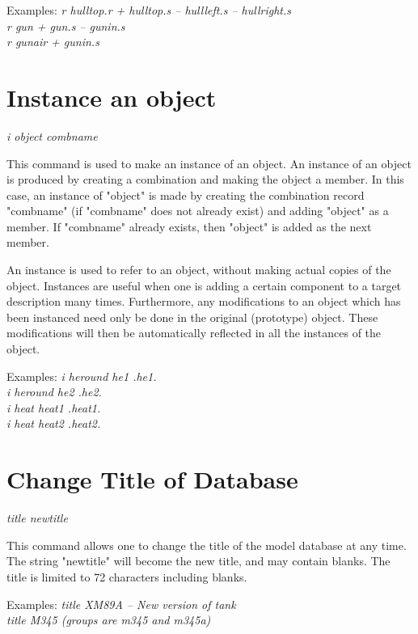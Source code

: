 Examples:
{\em
             r hulltop.r + hulltop.s -- hullleft.s -- hullright.s \\
             r gun + gun.s -- gunin.s \\
             r gunair + gunin.s \\
}

\section{Instance an object}

{\em \center
i object combname 
}

This command is used to make an instance of an object.
An instance of an object is produced by creating a combination 
and making the object a member.   
In this case, an instance of "object" is made by
creating the combination record "combname" (if "combname" does not
already exist) and adding "object" as a member.  
If "combname" already exists, then "object" is added as the next member.

An instance is used to refer to an object, without making actual copies
of the object.  Instances are useful when one is adding a certain
component to a target description many times.
Furthermore, any modifications to an object which has been instanced need only be
done in the original (prototype) object.
These modifications will then be automatically reflected in all the
instances of the object.

Examples:
{\em
                i heround he1 .he1. \\
                i heround he2 .he2. \\
                i heat heat1 .heat1. \\
                i heat heat2 .heat2. \\
}

\section{Change Title of Database}

{\em \center
title newtitle
}

This command allows one to change the title of the model database at any time.
The string "newtitle" will become the new title, and may contain blanks.
The title is limited to 72 characters including blanks.

Examples:
{\em
          title XM89A -- New version of tank \\
          title M345 (groups are m345 and m345a) \\
}

